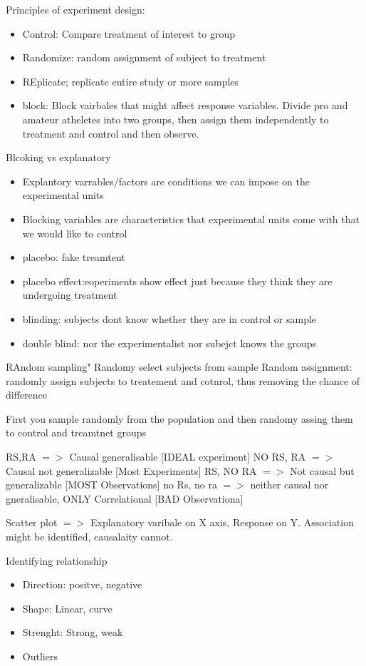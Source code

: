 \documentclass[a4paper]{article}
\begin{document}
Principles of experiment design:\\
\begin{itemize}
\item Control: Compare treatment of interest to group
\item Randomize: random assignment of subject to treatment
\item REplicate; replicate entire study or more samples 
\item block: Block vairbales that might affect response variables. Divide pro and amateur atheletes into two groups, then assign them independently to treatment and control and then observe.
\end{itemize}
Blcoking vs explanatory
\begin{itemize}
\item Explantory varrables/factors are conditions we can impose on the experimental units
\item Blocking variables are characteristics that experimental units 	come with that we would like to control
\end{itemize}
\begin{itemize}
\item placebo: fake treamtent
\item placebo effect:eoperiments show effect just because they think they are undergoing treatment
\item blinding: subjects dont know whether they are in control or sample
\item double blind: nor the experimentalist nor subejct knows the groups
\end{itemize}


RAndom sampling" Randomy select subjects from sample
Random assignment: randomly assign subjects to treatement and cotnrol, thus removing the chance of difference

First you sample randomly from the population and then randomy assing them to control and treamtnet groups

RS,RA $=>$ Causal  generalisable [IDEAL experiment]
NO RS, RA $=>$ Causal not generalizable [Most Experiments]
RS, NO RA $=>$ Not causal but generalizable [MOST Observations]
no Rs, no ra $=>$ neither causal nor gneralisable, ONLY Correlational [BAD Observationa]

Scatter plot $=>$ Explanatory varibale on X axis, Response on Y. Association might be identified, causalaity cannot.

Identifying relationship
\begin{itemize}
\item Direction: positve, negative
\item Shape: Linear, curve
\item Strenght: Strong, weak
\item Outliers
\end{itemize}
\end{document}
